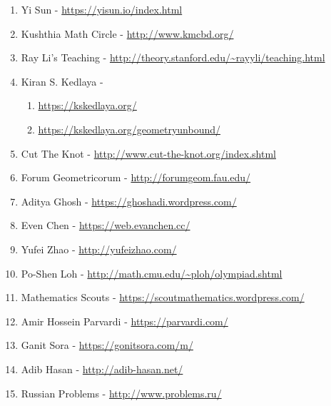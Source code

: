 \documentclass{article}
\begin{document}
\begin{enumerate}
\item Yi Sun - \url{https://yisun.io/index.html}
\item Kushthia Math Circle - \url{http://www.kmcbd.org/}
\item Ray Li's Teaching - \url{http://theory.stanford.edu/~rayyli/teaching.html}
\item Kiran S. Kedlaya - 
   \begin {enumerate}
     \item \url{https://kskedlaya.org/}
     \item \url {https://kskedlaya.org/geometryunbound/}
   \end {enumerate}
\item Cut The Knot - \url{http://www.cut-the-knot.org/index.shtml}
\item Forum Geometricorum - \url{http://forumgeom.fau.edu/}
\item Aditya Ghosh - \url{https://ghoshadi.wordpress.com/}
\item Even Chen - \url{https://web.evanchen.cc/}
\item Yufei Zhao - \url{http://yufeizhao.com/}
\item Po-Shen Loh - \url{http://math.cmu.edu/~ploh/olympiad.shtml}
\item Mathematics Scouts - \url{https://scoutmathematics.wordpress.com/}
\item Amir Hossein Parvardi - \url{https://parvardi.com/}
\item Ganit Sora - \url{https://gonitsora.com/m/}
\item Adib Hasan - \url {http://adib-hasan.net/}
\item Russian Problems - \url{http://www.problems.ru/}











\end {enumerate}
\end{document}
